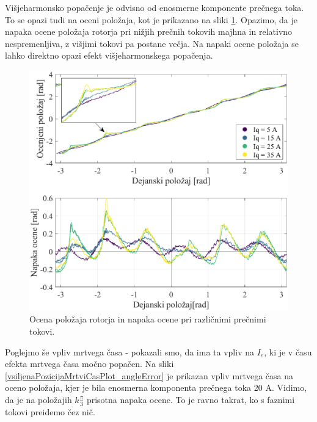 \documentclass[a4paper,twoside,openright,12pt,slovene]{book}
\begin{document}
\newpage 

Višjeharmonsko popačenje je odvisno od enosmerne komponente prečnega toka. To se opazi tudi na oceni položaja, kot je prikazano na sliki \ref{vsiljenaPozicijaTokovi_angleError}. Opazimo, da je napaka
ocene položaja rotorja pri nižjih prečnih tokovih majhna in relativno nespremenljiva, z višjimi tokovi pa postane večja. Na napaki ocene položaja se lahko direktno opazi efekt višjeharmonskega
popačenja. 

\begin{figure}[!htbp]
    \centering
    \includegraphics[width=1.05\columnwidth]{Slike/vsiljenaPozicijaTokovi_angleError.eps}
    \caption{\label{vsiljenaPozicijaTokovi_angleError} Ocena položaja rotorja in napaka ocene pri različnimi prečnimi tokovi. }
\end{figure}

\newpage
Poglejmo še vpliv mrtvega časa - pokazali smo, da ima ta vpliv na $I_e$, ki je v času efekta mrtvega časa močno popačen. Na sliki \ref{vsiljenaPozicijaMrtviCasPlot_angleError} je prikazan vpliv
mrtvega časa na oceno položaja, kjer je bila enosmerna komponenta prečnega toka 20 A. Vidimo, da je na položajih $k\frac{\pi}{3}$ prisotna napaka ocene. To je ravno takrat, ko s faznimi tokovi
preidemo čez nič.
\end{document}
